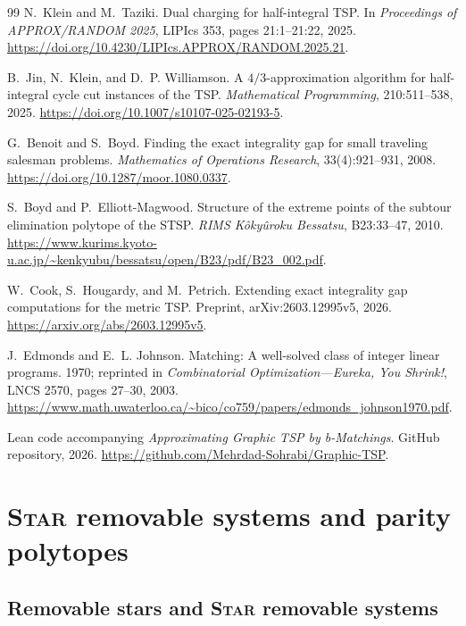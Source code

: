 \documentclass[11pt]{amsart}
\newcommand{\1}{\mathbbm{1}}
\begin{document}
\begin{thebibliography}{99}
N.~Klein and M.~Taziki.
Dual charging for half-integral TSP.
In \emph{Proceedings of APPROX/RANDOM 2025}, LIPIcs 353,
pages 21:1--21:22, 2025.
\url{https://doi.org/10.4230/LIPIcs.APPROX/RANDOM.2025.21}.

B.~Jin, N.~Klein, and D.~P. Williamson.
A $4/3$-approximation algorithm for half-integral cycle cut instances of
the TSP.
\emph{Mathematical Programming}, 210:511--538, 2025.
\url{https://doi.org/10.1007/s10107-025-02193-5}.

G.~Benoit and S.~Boyd.
Finding the exact integrality gap for small traveling salesman problems.
\emph{Mathematics of Operations Research}, 33(4):921--931, 2008.
\url{https://doi.org/10.1287/moor.1080.0337}.

S.~Boyd and P.~Elliott-Magwood.
Structure of the extreme points of the subtour elimination polytope of
the STSP.
\emph{RIMS K\^oky\^uroku Bessatsu}, B23:33--47, 2010.
\url{https://www.kurims.kyoto-u.ac.jp/~kenkyubu/bessatsu/open/B23/pdf/B23_002.pdf}.

W.~Cook, S.~Hougardy, and M.~Petrich.
Extending exact integrality gap computations for the metric TSP.
Preprint, arXiv:2603.12995v5, 2026.
\url{https://arxiv.org/abs/2603.12995v5}.

J.~Edmonds and E.~L. Johnson.
Matching: A well-solved class of integer linear programs.
1970; reprinted in \emph{Combinatorial Optimization---Eureka, You Shrink!},
LNCS 2570, pages 27--30, 2003.
\url{https://www.math.uwaterloo.ca/~bico/co759/papers/edmonds_johnson1970.pdf}.

Lean code accompanying
\emph{Approximating Graphic TSP by b-Matchings}.
GitHub repository, 2026.
\url{https://github.com/Mehrdad-Sohrabi/Graphic-TSP}.
\end{thebibliography}

\clearpage
\appendix

\section{\textsc{Star} removable systems and parity polytopes}
\label{sec:preliminaries}




\subsection{Removable stars and \textsc{Star} removable systems}
\end{document}
